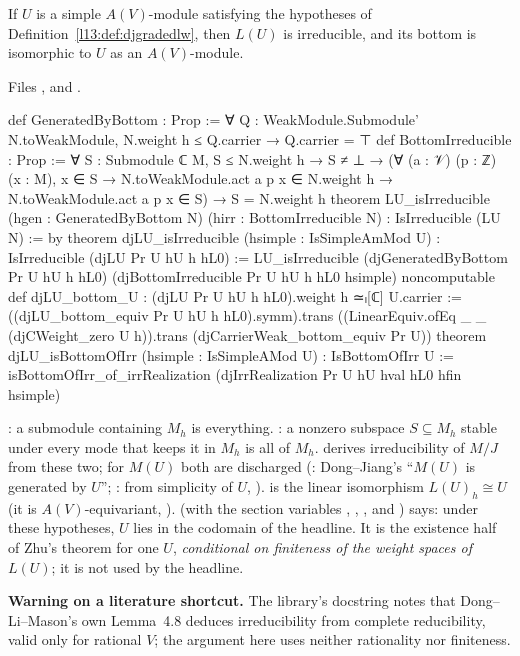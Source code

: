 \begin{theorem}\label{l13:thm:LUirr}
If $U$ is a simple $A(V)$-module satisfying the hypotheses of Definition~\ref{l13:def:djgradedlw}, then $L(U)$ is irreducible, and
its bottom is isomorphic to $U$ as an $A(V)$-module.
\end{theorem}
\noindent Files ,
 and
.
\begin{leancode}
def GeneratedByBottom : Prop :=
  ∀ Q : WeakModule.Submodule' N.toWeakModule, N.weight h ≤ Q.carrier → Q.carrier = ⊤
def BottomIrreducible : Prop :=
  ∀ S : Submodule ℂ M, S ≤ N.weight h → S ≠ ⊥ →
    (∀ (a : 𝒱) (p : ℤ) (x : M), x ∈ S → N.toWeakModule.act a p x ∈ N.weight h →
      N.toWeakModule.act a p x ∈ S) →
    S = N.weight h
theorem LU_isIrreducible (hgen : GeneratedByBottom N) (hirr : BottomIrreducible N) :
    IsIrreducible (LU N) := by
theorem djLU_isIrreducible (hsimple : IsSimpleAmMod U) :
    IsIrreducible (djLU Pr U hU h hL0) :=
  LU_isIrreducible (djGeneratedByBottom Pr U hU h hL0) (djBottomIrreducible Pr U hU h hL0 hsimple)
noncomputable def djLU_bottom_U : (djLU Pr U hU h hL0).weight h ≃ₗ[ℂ] U.carrier :=
  ((djLU_bottom_equiv Pr U hU h hL0).symm).trans
    ((LinearEquiv.ofEq _ _ (djCWeight_zero U h)).trans (djCarrierWeak_bottom_equiv Pr U))
theorem djLU_isBottomOfIrr (hsimple : IsSimpleAMod U) : IsBottomOfIrr U :=
  isBottomOfIrr_of_irrRealization (djIrrRealization Pr U hU hval hL0 hfin hsimple)
\end{leancode}

\begin{dictionary}
: a submodule containing $M_h$ is everything. : a nonzero subspace $S\subseteq
M_h$ stable under every mode that keeps it in $M_h$ is all of $M_h$.  derives irreducibility of $M/J$ from
these two; for $M(U)$ both are discharged (: Dong--Jiang's ``$M(U)$ is generated by $U$'';
: from simplicity of $U$, ).  is the linear isomorphism
$L(U)_h\cong U$ (it is $A(V)$-equivariant, ).  (with the section variables
, , ,  and ) says: under these hypotheses, $U$ lies in the codomain
 of the headline. It is the existence half of Zhu's theorem for one $U$, \emph{conditional on finiteness of the
weight spaces of $L(U)$}; it is not used by the headline.

\textbf{Warning on a literature shortcut.} The library's docstring notes that Dong--Li--Mason's own Lemma~4.8 deduces irreducibility
from complete reducibility, valid only for rational $V$; the argument here uses neither rationality nor finiteness.
\end{dictionary}

